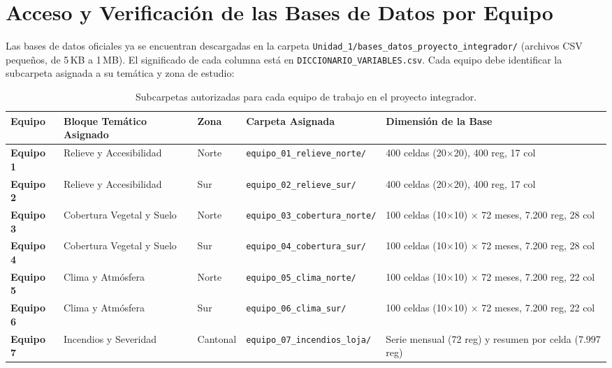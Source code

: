 \documentclass[11pt,a4paper]{article}
\begin{document}
\section{Acceso y Verificación de las Bases de Datos por Equipo}

Las bases de datos oficiales ya se encuentran descargadas en la carpeta \texttt{Unidad\_1/\allowbreak bases\_\allowbreak datos\_\allowbreak proyecto\_\allowbreak integrador/} (archivos CSV pequeños, de 5\,KB a 1\,MB). El significado de cada columna está en \texttt{DICCIONARIO\_\allowbreak VARIABLES.csv}. Cada equipo debe identificar la subcarpeta asignada a su temática y zona de estudio:

\begin{table}[h!]
\centering
\scriptsize
\renewcommand{\arraystretch}{1.15}
\begin{tabularx}{\textwidth}{C{1.2cm} L{3.5cm} C{2.0cm} Y L{4.5cm}}
\toprule
\textbf{Equipo} & \textbf{Bloque Temático Asignado} & \textbf{Zona} & \textbf{Carpeta Asignada} & \textbf{Dimensión de la Base} \\
\midrule
\textbf{Equipo 1} & Relieve y Accesibilidad & Norte & \texttt{equipo\_01\_relieve\_}\newline\texttt{norte/} & 400 celdas (20$\times$20), 400 reg, 17 col \\
\textbf{Equipo 2} & Relieve y Accesibilidad & Sur & \texttt{equipo\_02\_relieve\_}\newline\texttt{sur/} & 400 celdas (20$\times$20), 400 reg, 17 col \\
\textbf{Equipo 3} & Cobertura Vegetal y Suelo & Norte & \texttt{equipo\_03\_cobertura\_}\newline\texttt{norte/} & 100 celdas (10$\times$10) $\times$ 72 meses, 7.200 reg, 28 col \\
\textbf{Equipo 4} & Cobertura Vegetal y Suelo & Sur & \texttt{equipo\_04\_cobertura\_}\newline\texttt{sur/} & 100 celdas (10$\times$10) $\times$ 72 meses, 7.200 reg, 28 col \\
\textbf{Equipo 5} & Clima y Atmósfera & Norte & \texttt{equipo\_05\_clima\_}\newline\texttt{norte/} & 100 celdas (10$\times$10) $\times$ 72 meses, 7.200 reg, 22 col \\
\textbf{Equipo 6} & Clima y Atmósfera & Sur & \texttt{equipo\_06\_clima\_}\newline\texttt{sur/} & 100 celdas (10$\times$10) $\times$ 72 meses, 7.200 reg, 22 col \\
\textbf{Equipo 7} & Incendios y Severidad & Cantonal & \texttt{equipo\_07\_incendios\_}\newline\texttt{loja/} & Serie mensual (72 reg) y resumen por celda (7.997 reg) \\
\bottomrule
\end{tabularx}
\caption{Subcarpetas autorizadas para cada equipo de trabajo en el proyecto integrador.}
\label{tab:equipos_carpetas}
\end{table}
\end{document}
